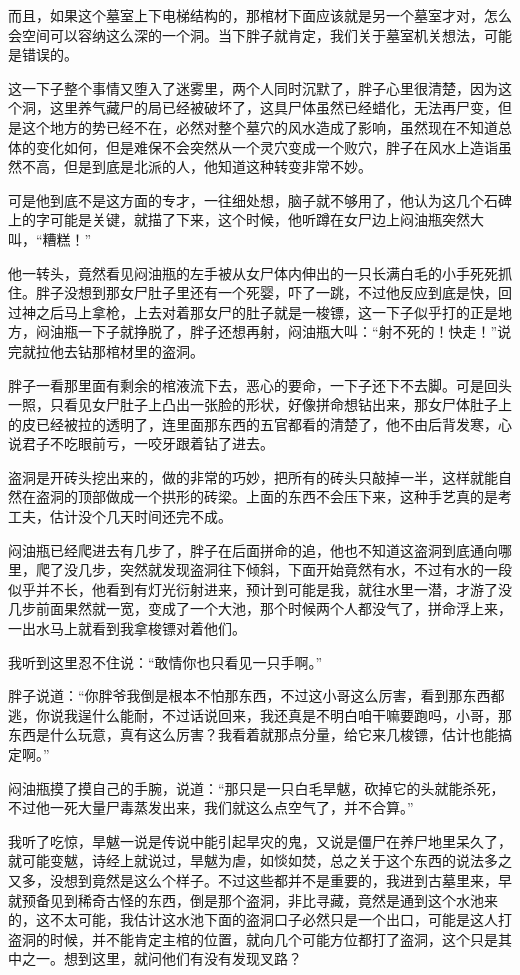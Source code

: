 而且，如果这个墓室上下电梯结构的，那棺材下面应该就是另一个墓室才对，怎么会空间可以容纳这么深的一个洞。当下胖子就肯定，我们关于墓室机关想法，可能是错误的。

这一下子整个事情又堕入了迷雾里，两个人同时沉默了，胖子心里很清楚，因为这个洞，这里养气藏尸的局已经被破坏了，这具尸体虽然已经蜡化，无法再尸变，但是这个地方的势已经不在，必然对整个墓穴的风水造成了影响，虽然现在不知道总体的变化如何，但是难保不会突然从一个灵穴变成一个败穴，胖子在风水上造诣虽然不高，但是到底是北派的人，他知道这种转变非常不妙。

可是他到底不是这方面的专才，一往细处想，脑子就不够用了，他认为这几个石碑上的字可能是关键，就描了下来，这个时候，他听蹲在女尸边上闷油瓶突然大叫，“糟糕！”

他一转头，竟然看见闷油瓶的左手被从女尸体内伸出的一只长满白毛的小手死死抓住。胖子没想到那女尸肚子里还有一个死婴，吓了一跳，不过他反应到底是快，回过神之后马上拿枪，上去对着那女尸的肚子就是一梭镖，这一下子似乎打的正是地方，闷油瓶一下子就挣脱了，胖子还想再射，闷油瓶大叫：“射不死的！快走！”说完就拉他去钻那棺材里的盗洞。

胖子一看那里面有剩余的棺液流下去，恶心的要命，一下子还下不去脚。可是回头一照，只看见女尸肚子上凸出一张脸的形状，好像拼命想钻出来，那女尸体肚子上的皮已经被拉的透明了，连里面那东西的五官都看的清楚了，他不由后背发寒，心说君子不吃眼前亏，一咬牙跟着钻了进去。

盗洞是开砖头挖出来的，做的非常的巧妙，把所有的砖头只敲掉一半，这样就能自然在盗洞的顶部做成一个拱形的砖梁。上面的东西不会压下来，这种手艺真的是考工夫，估计没个几天时间还完不成。

闷油瓶已经爬进去有几步了，胖子在后面拼命的追，他也不知道这盗洞到底通向哪里，爬了没几步，突然就发现盗洞往下倾斜，下面开始竟然有水，不过有水的一段似乎并不长，他看到有灯光衍射进来，预计到可能是我，就往水里一潜，才游了没几步前面果然就一宽，变成了一个大池，那个时候两个人都没气了，拼命浮上来，一出水马上就看到我拿梭镖对着他们。

我听到这里忍不住说：“敢情你也只看见一只手啊。”

胖子说道：“你胖爷我倒是根本不怕那东西，不过这小哥这么厉害，看到那东西都逃，你说我逞什么能耐，不过话说回来，我还真是不明白咱干嘛要跑吗，小哥，那东西是什么玩意，真有这么厉害？我看着就那点分量，给它来几梭镖，估计也能搞定啊。”

闷油瓶摸了摸自己的手腕，说道：“那只是一只白毛旱魃，砍掉它的头就能杀死，不过他一死大量尸毒蒸发出来，我们就这么点空气了，并不合算。”

我听了吃惊，旱魃一说是传说中能引起旱灾的鬼，又说是僵尸在养尸地里呆久了，就可能变魃，诗经上就说过，旱魃为虐，如惔如焚，总之关于这个东西的说法多之又多，没想到竟然是这么个样子。不过这些都并不是重要的，我进到古墓里来，早就预备见到稀奇古怪的东西，倒是那个盗洞，非比寻藏，竟然是通到这个水池来的，这不太可能，我估计这水池下面的盗洞口子必然只是一个出口，可能是这人打盗洞的时候，并不能肯定主棺的位置，就向几个可能方位都打了盗洞，这个只是其中之一。想到这里，就问他们有没有发现叉路？

